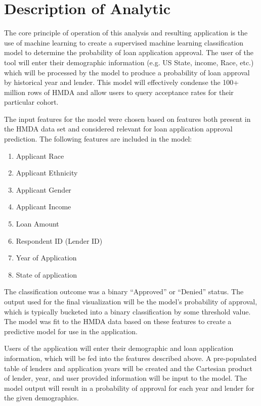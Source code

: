 \documentclass[conference,compsoc]{IEEEtran}
\begin{document}
\section{Description of Analytic}

The core principle of operation of this analysis and resulting application is the use of machine learning to create a supervised machine learning classification model to determine the probability of loan application approval. The user of the tool will enter their demographic information (e.g. US State, income, Race, etc.) which will be processed by the model to produce a probability of loan approval by historical year and lender. This model will effectively condense the 100+ million rows of HMDA and allow users to query acceptance rates for their particular cohort. 


    The input features for the model were chosen based on features both present in the HMDA data set and considered relevant for loan application approval prediction. The following features are included in the model:


\begin{enumerate}
\item Applicant Race
\item Applicant Ethnicity
\item Applicant Gender
\item Applicant Income
\item Loan Amount
\item Respondent ID (Lender ID)
\item Year of Application
\item State of application


\end{enumerate}

The classification outcome was a binary “Approved” or “Denied” status. The output used for the final visualization will be the model’s probability of approval, which is typically bucketed into a binary classification by some threshold value. The model was fit to the HMDA data based on these features to create a predictive model for use in the application.

Users of the application will enter their demographic and loan application information, which will be fed into the features described above. A pre-populated table of lenders and application years will be created and the Cartesian product of lender, year, and user provided information will be input to the model. The model output will result in a probability of approval for each year and lender for the given demographics.
\end{document}
